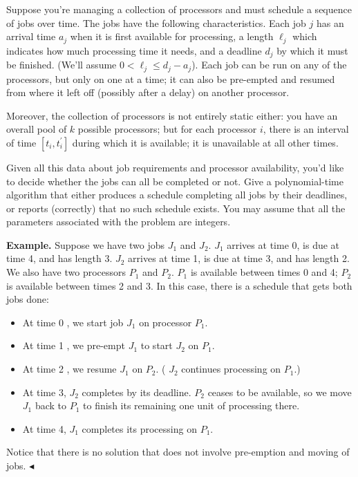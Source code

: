 \documentclass[11pt]{article}
\newenvironment{problem}[2][Problem]{\begin{trivlist}
    \item[\hskip \labelsep{\bfseries#1}\hskip\labelsep{\bfseries#2.}]\mbox{}\newline}{\hfill$\blacktriangleleft$\end{trivlist}}
\begin{document}
\begin{problem}{5. (Job Scheduling of Multi-Processors)}
    Suppose you're managing a collection of processors and must schedule a sequence of jobs over time. The jobs have the following characteristics. Each job $j$ has an arrival time $a_j$ when it is first available for processing, a length $\ell_j$ which indicates how much processing time it needs, and a deadline $d_{j}$ by which it must be finished. (We'll assume $0<\ell_{j} \leq d_{j}-a_{j}$). Each job can be run on any of the processors, but only on one at a time; it can also be pre-empted and resumed from where it left off (possibly after a delay) on another processor.

Moreover, the collection of processors is not entirely static either: you have an overall pool of $k$ possible processors; but for each processor $i$, there is an interval of time $\left[t_{i}, t_{i}^{\prime}\right]$ during which it is available; it is unavailable at all other times.

Given all this data about job requirements and processor availability, you'd like to decide whether the jobs can all be completed or not. Give a polynomial-time algorithm that either produces a schedule completing all jobs by their deadlines, or reports (correctly) that no such schedule exists. You may assume that all the parameters associated with the problem are integers.

\textbf{Example.} Suppose we have two jobs $J_{1}$ and $J_{2}$. $J_{1}$ arrives at time 0, is due at time 4, and has length 3. $J_{2}$ arrives at time 1, is due at time 3, and has length 2. We also have two processors $P_{1}$ and $P_{2}$. $P_{1}$ is available between times 0 and 4; $P_{2}$ is available between times 2 and 3. In this case, there is a schedule that gets both jobs done:
\begin{itemize}
  \item At time 0 , we start job $J_{1}$ on processor $P_{1}$.
  \item At time 1 , we pre-empt $J_{1}$ to start $J_{2}$ on $P_{1}$.
  \item At time 2 , we resume $J_{1}$ on $P_{2}$. ( $J_{2}$ continues processing on $P_{1}$.)
  \item At time 3, $J_{2}$ completes by its deadline. $P_{2}$ ceases to be available, so we move $J_{1}$ back to $P_{1}$ to finish its remaining one unit of processing there.
  \item At time 4, $J_{1}$ completes its processing on $P_{1}$.
\end{itemize}
Notice that there is no solution that does not involve pre-emption and moving of jobs.
\end{problem}
\end{document}

